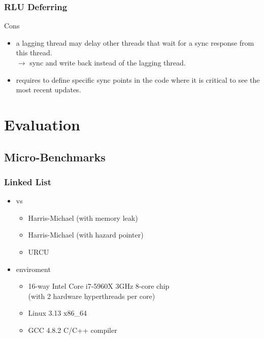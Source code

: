 \documentclass{beamer}
\begin{document}

\begin{frame}[t]
  \frametitle{RLU Deferring}

  Cons
  \begin{itemize}
  \item a lagging thread may delay other threads that wait for a sync response from this thread.\\
    $\rightarrow$ sync and write back instead of the lagging thread.
  \item requires to define specific sync points in the code where it is critical to see the most recent updates.
  \end{itemize}
  
\end{frame}


\section{Evaluation}



\subsection{Micro-Benchmarks}


\begin{frame}[t]
  \frametitle{Linked List}

  \begin{itemize}
  \item vs
    \begin{itemize}
    \item Harris-Michael (with memory leak)
    \item Harris-Michael (with hazard pointer)
    \item URCU
    \end{itemize}
  \item enviroment
    \begin{itemize}
    \item 16-way Intel Core i7-5960X 3GHz 8-core chip\\
      (with 2 hardware hyperthreads per core)
    \item Linux 3.13 x86\_64
    \item GCC 4.8.2 C/C++ compiler
    \end{itemize}
  \end{itemize}

\end{frame}
\end{document}
